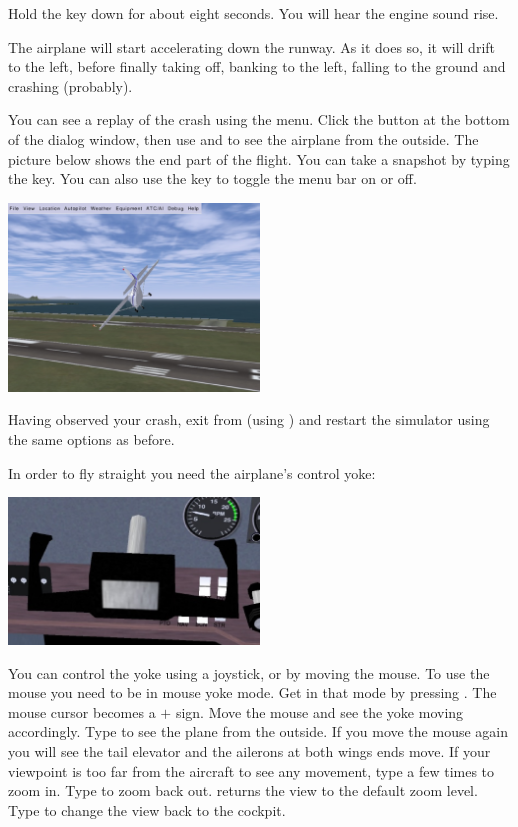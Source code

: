 \begin{itemize}
Hold the  key down for about eight seconds. You will
hear the engine sound rise.

The airplane will start accelerating down the runway. As it does so, it will
drift to the left, before finally taking off, banking to the left,
falling to the ground and crashing (probably).

You can see a replay of the crash using the  
menu. Click the  button at the bottom of the dialog window, then
use  and  to see the airplane from the outside. The
picture below shows the end part of the flight. You can take a snapshot by
typing the  key.
You can also use the  key to toggle the menu bar on or off.

\begin{center}
\includegraphics[width=0.5\textwidth]{img/tut_9}
\end{center}

Having observed your crash, exit from \FlightGear (using )
and restart the simulator using the same options as before.

In order to fly straight you need the airplane's control yoke:

\begin{center}
\includegraphics[width=0.5\textwidth]{img/tut_10}
\end{center}

You can control the yoke using a joystick, or by moving the mouse. To use the
mouse you need to be in mouse yoke mode. Get in that mode by pressing .
The mouse cursor becomes a $+$ sign. Move the mouse and see the
yoke moving accordingly. Type  to see the plane from the outside. If you
move the mouse again you will see the tail elevator and the ailerons at both
wings ends move. If your viewpoint is too far from the aircraft to see any
movement, type  a few times to zoom in.
Type  to zoom back out.  returns the view to the default zoom
level. Type  to change the view back to the cockpit.


\end{itemize}
